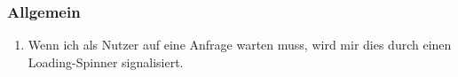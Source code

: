 \subsubsection{Allgemein}
\begin{enumerate}
	\item Wenn ich als Nutzer auf eine Anfrage warten muss, wird mir dies durch einen Loading-Spinner signalisiert.	
\end{enumerate}
\newpage

